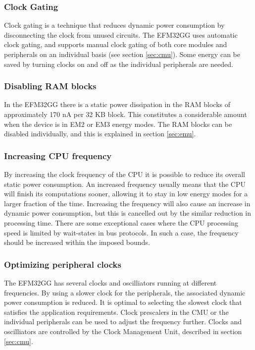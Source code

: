 \subsubsection{Clock Gating}
Clock gating is a technique that reduces dynamic power consumption by disconnecting the clock from unused circuits. The EFM32GG uses automatic clock gating, and supports manual clock gating of both core modules and peripherals on an individual basis (see section \ref{sec:cmu}). Some energy can be saved by turning clocks on and off as the individual peripherals are needed.\cite{efm32-energy-optimization} 


\subsubsection{Disabling RAM blocks}
In the EFM32GG there is a static power dissipation in the RAM blocks of approximately 170 nA per 32 KB block. This constitutes a considerable amount when the device is in EM2 or EM3 energy modes. The RAM blocks can be disabled individually, and this is explained in section \ref{sec:emu}.\cite{efm32-energy-optimization}


\subsubsection{Increasing CPU frequency}
By increasing the clock frequency of the CPU it is possible to reduce its overall static power consumption. An increased frequency usually means that the CPU will finish its computations sooner, allowing it to stay in low energy modes for a larger fraction of the time. Increasing the frequency will also cause an increase in dynamic power consumption, but this is cancelled out by the similar reduction in processing time. There are some exceptional cases where the CPU processing speed is limited by wait-states in bus protocols. In such a case, the frequency should be increased within the imposed bounds.\cite{efm32-energy-optimization}


\subsubsection{Optimizing peripheral clocks}
The EFM32GG has several clocks and oscilliators running at different frequencies. By using a slower clock for the peripherals, the associated dynamic power consumption is reduced. It is optimal to selecting the slowest clock that satisfies the application requirements. Clock prescalers in the CMU or the individual peripherals can be used to adjust the frequency further. Clocks and oscilliators are controlled by the Clock Management Unit, described in section \ref{sec:cmu}.\cite{efm32-energy-optimization} 


